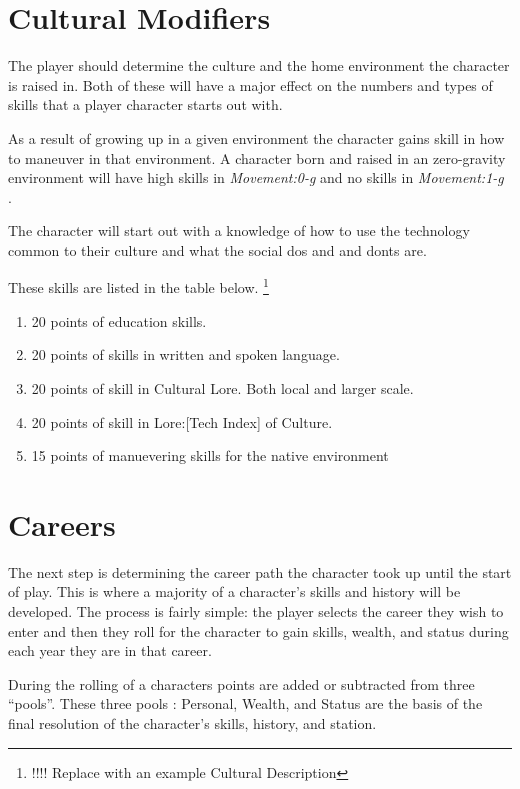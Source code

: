 \section{Cultural Modifiers}

The player should determine the culture and the home environment
the character is raised in. Both of these will have a major 
effect on the numbers and types of skills that a player character
starts out with.

As a result of growing up in a given environment the character 
gains skill in how to maneuver in that environment. A character
born and raised in an zero-gravity environment will have high skills
in {\em Movement:0-g } and no skills in {\em Movement:1-g }.

The character will start out with a knowledge of how to
use the technology common to their culture and what the social dos and
and donts are.

These skills are listed in the table below.
\footnote{!!!! Replace with an example Cultural Description }
\begin{enumerate}
	\item 20 points of education skills.
	\item 20 points of skills in written and spoken language.
	\item 20 points of skill in Cultural Lore. Both local and larger scale.
	\item 20 points of skill in Lore:[Tech Index] of Culture.
	\item 15 points of manuevering skills for the native environment
\end{enumerate}

\section{Careers}

The next step is determining the career path the character
took up until the start of play. This is where a majority of a character's
skills and history will be developed. The process is fairly simple:
the player selects the career they wish to enter and then they roll 
for the character to gain skills, wealth, and status during each 
year they are in that career. 

During the rolling of a characters points are added
or subtracted from three ``pools''. These three pools : Personal,
Wealth, and Status are the basis of the final resolution of
the character's skills, history, and station.

